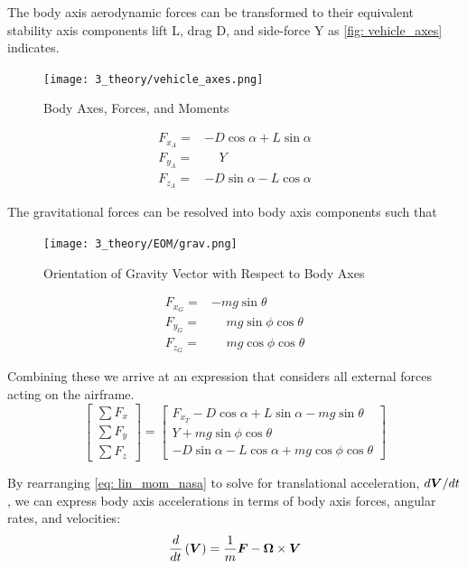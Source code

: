 \documentclass[12pt]{ucthesis}
\begin{document}
The body axis aerodynamic forces can be transformed to their equivalent stability axis components lift L, drag D, and side-force Y as \autoref{fig: vehicle_axes} indicates.
%
	\begin{figure}[H] 
		\centering
		\texttt{[image: 3\_theory/vehicle\_axes.png]}
		\caption{Body Axes, Forces, and Moments}
		\label{fig: vehicle_axes}
	\end{figure}

	\begin{align}
		F_{x_{A}} =& -D\cos\alpha + L\sin\alpha \\
		F_{y_{A}} =& \quad\, Y  \\
		F_{z_{A}} =& -D\sin\alpha - L\cos\alpha
	\end{align}%

The gravitational forces can be resolved into body axis components such that

	\begin{figure}[H] 
		\centering
		\texttt{[image: 3\_theory/EOM/grav.png]}
		\caption{Orientation of Gravity Vector with Respect to Body Axes \citep{McRuer1973}}
		\label{fig: grav}
	\end{figure}
	\begin{align}
		F_{x_{G}} =& -mg\sin\theta \\
		F_{y_{G}} =& \quad\, mg\sin\phi\cos\theta \\
		F_{z_{G}} =& \quad\, mg\cos\phi\cos\theta
	\end{align}

Combining these we arrive at an expression that considers all external forces acting on the airframe.
%
	\begin{equation}
		\left[ \begin{array}{c} \sum F_{x} \\ \sum F_{y} \\ \sum F_{z} \end{array}\right] = \left[ \begin{array}{c} 
		F_{x_{T}} - D\cos\alpha + L\sin\alpha - mg\sin\theta \\
		Y + mg\sin\phi\cos\theta\\
		-D\sin\alpha - L\cos\alpha + mg\cos\phi\cos\theta
		\end{array}\right]
		\label{eq: lin_mom_F_sub}
	\end{equation}

By rearranging \autoref{eq: lin_mom_nasa} to solve for translational acceleration, $d\boldsymbol{V}/dt$, we can express body axis accelerations in terms of body axis forces, angular rates, and velocities: 
%
	\begin{equation}
		\frac{d}{dt} \left( \boldsymbol{V} \right) = \frac{1}{m} \boldsymbol{F}- \boldsymbol{\Omega} \times \boldsymbol{V}
		\label{eq: lin_mom_nasa_re}
	\end{equation}%
\end{document}
